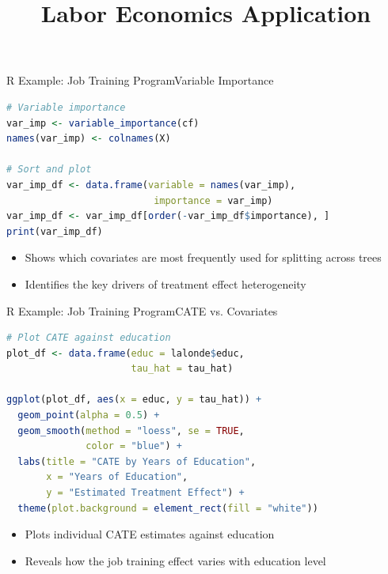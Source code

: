 \documentclass[hyperref={pdfpagelabels=false}]{beamer}
\begin{document}
\begin{frame}[fragile]{R Example: Job Training Program}{Variable Importance}
\begin{lstlisting}[language=R]
# Variable importance
var_imp <- variable_importance(cf)
names(var_imp) <- colnames(X)

# Sort and plot
var_imp_df <- data.frame(variable = names(var_imp),
                          importance = var_imp)
var_imp_df <- var_imp_df[order(-var_imp_df$importance), ]
print(var_imp_df)
\end{lstlisting}
	\begin{itemize}
		\item Shows which covariates are most frequently used for splitting across trees
		\vspace{0.2cm}
		\item Identifies the key drivers of treatment effect heterogeneity
	\end{itemize}
\end{frame}




\begin{frame}[fragile]{R Example: Job Training Program}{CATE vs. Covariates}
\begin{lstlisting}[language=R]
# Plot CATE against education
plot_df <- data.frame(educ = lalonde$educ,
                      tau_hat = tau_hat)

ggplot(plot_df, aes(x = educ, y = tau_hat)) +
  geom_point(alpha = 0.5) +
  geom_smooth(method = "loess", se = TRUE,
              color = "blue") +
  labs(title = "CATE by Years of Education",
       x = "Years of Education",
       y = "Estimated Treatment Effect") +
  theme(plot.background = element_rect(fill = "white"))
\end{lstlisting}
	\begin{itemize}
		\item Plots individual CATE estimates against education
		\vspace{0.2cm}
		\item Reveals how the job training effect varies with education level
	\end{itemize}
\end{frame}




\title[]
{Labor Economics Application}

\author{}
\institute{}
\date{}

\begin{frame}{}
	\titlepage
\end{frame}
\end{document}

